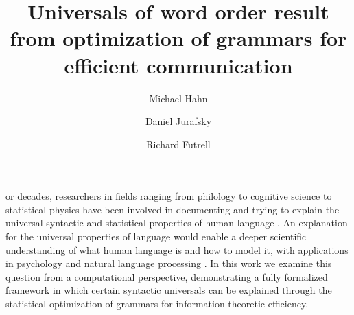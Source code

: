 \documentclass[9pt,twocolumn,twoside,lineno]{pnas-new}
\title{Universals of word order result from optimization of grammars for efficient communication}
\author[a,1,2]{Michael Hahn}
\author[a]{Daniel Jurafsky}
\author[b]{Richard Futrell}
\affil[a]{Stanford University}
\affil[b]{University of California, Irvine}
\begin{document}
\maketitle
\thispagestyle{firststyle}

or decades, researchers in fields ranging from philology to cognitive science to statistical physics have been involved in documenting and trying to explain the universal syntactic and statistical properties of human language \cite{behaghel1909beziehungen,zipf1949human,greenberg1963universals,lin2017critical}. An explanation for the universal properties of language would enable a deeper scientific understanding of what human language is and how to model it, with applications in psychology and natural language processing \cite{hawkins2007processing,bender2009linguistically,bender2013linguistic}. In this work we examine this question from a computational perspective, demonstrating a fully formalized framework in which certain syntactic universals can be explained through the statistical optimization of grammars for information-theoretic efficiency. %
\end{document}
